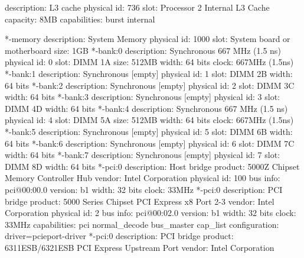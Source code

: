 \documentclass[mingoth,a4paper]{jsarticle}
\begin{document}
{{{{{{\begin{commandline}
             description: L3 cache
             physical id: 736
             slot: Processor 2 Internal L3 Cache
             capacity: 8MB
             capabilities: burst internal
\end{commandline}
\begin{commandline}
     *-memory
          description: System Memory
          physical id: 1000
          slot: System board or motherboard
          size: 1GB
        *-bank:0
             description: Synchronous 667 MHz (1.5 ns)
             physical id: 0
             slot: DIMM 1A
             size: 512MB
             width: 64 bits
             clock: 667MHz (1.5ns)
        *-bank:1
             description: Synchronous [empty]
             physical id: 1
             slot: DIMM 2B
             width: 64 bits
        *-bank:2
             description: Synchronous [empty]
             physical id: 2
             slot: DIMM 3C
             width: 64 bits
        *-bank:3
             description: Synchronous [empty]
             physical id: 3
             slot: DIMM 4D
             width: 64 bits
        *-bank:4
             description: Synchronous 667 MHz (1.5 ns)
             physical id: 4
             slot: DIMM 5A
             size: 512MB
             width: 64 bits
             clock: 667MHz (1.5ns)
        *-bank:5
             description: Synchronous [empty]
             physical id: 5
             slot: DIMM 6B
             width: 64 bits
        *-bank:6
             description: Synchronous [empty]
             physical id: 6
             slot: DIMM 7C
             width: 64 bits
        *-bank:7
             description: Synchronous [empty]
             physical id: 7
             slot: DIMM 8D
             width: 64 bits
     *-pci:0
          description: Host bridge
          product: 5000Z Chipset Memory Controller Hub
          vendor: Intel Corporation
          physical id: 100
          bus info: pci@00:00.0
          version: b1
          width: 32 bits
          clock: 33MHz
        *-pci:0
             description: PCI bridge
             product: 5000 Series Chipset PCI Express x8 Port 2-3
             vendor: Intel Corporation
             physical id: 2
             bus info: pci@00:02.0
             version: b1
             width: 32 bits
             clock: 33MHz
             capabilities: pci normal_decode bus_master cap_list
             configuration: driver=pcieport-driver
           *-pci:0
                description: PCI bridge
                product: 6311ESB/6321ESB PCI Express Upstream Port
                vendor: Intel Corporation

\end{commandline}}}}}}}
\end{document}
